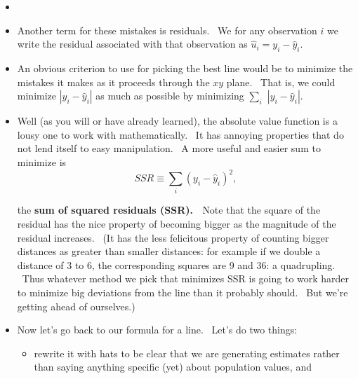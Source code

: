 \documentclass[11pt]{article}
\begin{document}
\begin{itemize}
\item {}

\item Another term for these mistakes is residuals. \ We for any observation 
$i$ we write the residual associated with that observation as $\widehat{u}%
_{i}=y_{i}-\widehat{y}_{i}.$

\item An obvious criterion to use for picking the best line would be to
minimize the mistakes it makes as it proceeds through the $xy$ plane. \ That
is, we could minimize $\left\vert y_{i}-\widehat{y}_{i}\right\vert $ as much
as possible by minimizing $\sum_{i}$ $\left\vert y_{i}-\widehat{y}%
_{i}\right\vert .$

\item Well (as you will or have already learned), the absolute value
function is a lousy one to work with mathematically. \ It has annoying
properties that do not lend itself to easy manipulation. \ A more useful and
easier sum to minimize is%
\begin{equation*}
SSR\equiv \sum_{i}\left( y_{i}-\widehat{y}_{i}\right) ^{2},
\end{equation*}

the \textbf{sum of squared residuals (SSR). \ }Note that the square of the
residual has the nice property of becoming bigger as the magnitude of the
residual increases. \ (It has the less felicitous property of counting
bigger distances as greater than smaller distances: for example if we double
a distance of 3 to 6, the corresponding squares are 9 and 36: a quadrupling.
\ Thus whatever method we pick that minimizes SSR is going to work harder to
minimize big deviations from the line than it probably should. \ But we're
getting ahead of ourselves.)

\item Now let's go back to our formula for a line. \ Let's do two things:

\begin{itemize}
\item rewrite it with hats to be clear that we are generating estimates
rather than saying anything specific (yet) about population values, and


\end{itemize}
\end{itemize}
\end{document}
